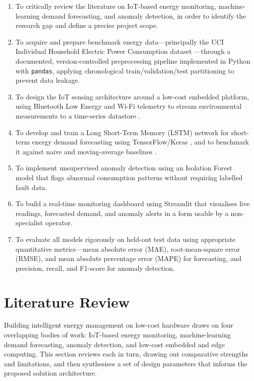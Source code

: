 \documentclass[conference]{IEEEtran}
\begin{document}
\begin{enumerate}
\item To critically review the literature on IoT-based energy monitoring,
machine-learning demand forecasting, and anomaly detection, in order to identify
the research gap and define a precise project scope.
 
\item To acquire and prepare benchmark energy data---principally the UCI
Individual Household Electric Power Consumption dataset
\cite{hebrail2012individual}---through a documented, version-controlled
preprocessing pipeline implemented in Python with \texttt{pandas}, applying
chronological train/validation/test partitioning to prevent data leakage.
 
\item To design the IoT sensing architecture around a low-cost embedded platform, using Bluetooth Low
Energy and Wi-Fi telemetry to stream environmental measurements to a time-series
datastore \cite{munirathinam2020industry,warden2019tinyml}.
 
\item To develop and train a Long Short-Term Memory (LSTM) network
\cite{hochreiter1997long} for short-term energy demand forecasting using
TensorFlow/Keras \cite{abadi2016tensorflow}, and to benchmark it against naive
and moving-average baselines \cite{makridakis2018statistical}.
 
\item To implement unsupervised anomaly detection using an Isolation Forest model
\cite{liu2008isolation} that flags abnormal consumption patterns without
requiring labelled fault data.

\item To build a real-time monitoring dashboard using Streamlit that visualises
live readings, forecasted demand, and anomaly alerts in a form usable by a
non-specialist operator.
 
\item To evaluate all models rigorously on held-out test data using appropriate
quantitative metrics---mean absolute error (MAE), root-mean-square error (RMSE),
and mean absolute percentage error (MAPE) for forecasting, and precision,
recall, and F1-score for anomaly detection.
 
 
\end{enumerate}

\section{Literature Review}\label{sec:litreview}
Building intelligent energy management on low-cost hardware draws on four
overlapping bodies of work: IoT-based energy monitoring, machine-learning demand
forecasting, anomaly detection, and low-cost embedded and edge computing. This
section reviews each in turn, drawing out comparative strengths and limitations,
and then synthesises a set of design parameters that informs the proposed
solution architecture.
 
\end{document}
